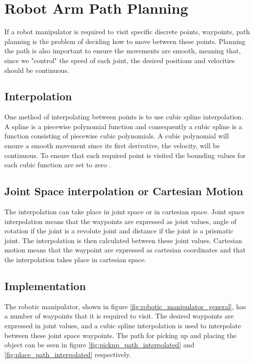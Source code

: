 \section*{Robot Arm Path Planning} 
If a robot manipulator is required to visit specific discrete points, waypoints, path planning is the problem of deciding how to move between these points. Planning the path is also important to ensure the movements are smooth, meaning that, since we "control" the speed of each joint, the desired positions and velocities should be continuous.%
\subsection*{Interpolation}
One method of interpolating between points is to use cubic spline interpolation. A spline \cite{spline_wolfram} is a piecewise polynomial function and consequently a cubic spline is a function consisting of piecewise cubic polynomials. A cubic polynomial will ensure a smooth movement since its first derivative, the velocity, will be continuous. To ensure that each required point is visited the bounding values for each cubic function are set to zero \cite{cubic_spline_wolfram}.
\subsection*{Joint Space interpolation or Cartesian Motion}
The interpolation can take place in joint space or in cartesian space. Joint space interpolation means that the waypoints are expressed as joint values, angle of rotation if the joint is a revolute joint and distance if the joint is a prismatic joint.
The interpolation is then calculated between these joint values. Cartesian motion means that the waypoint are expressed as cartesian coordinates and that the interpolation takes place in cartesian space.
\subsection*{Implementation} %
The robotic manipulator, shown in figure \ref{fig:robotic_manipulator_general}, has a number of waypoints that it is required to visit. The desired waypoints are expressed in joint values, and a cubic spline interpolation is used to interpolate between these joint space waypoints. The path for picking up and placing the object can be seen in figure \ref{fig:pickup_path_interpolated} and \ref{fig:place_path_interpolated} respectively.

